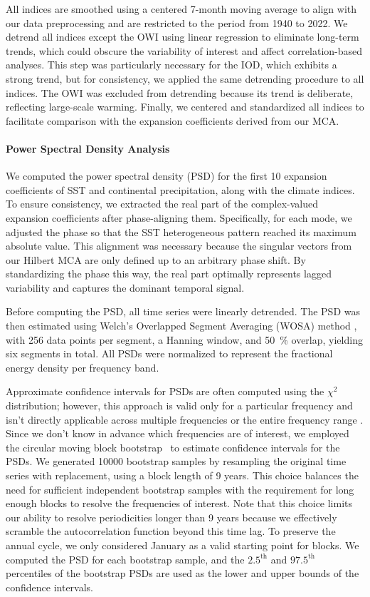 All indices are smoothed using a centered 7-month moving average to align with our data preprocessing and are restricted to the period from 1940 to 2022. We detrend all indices except the OWI using linear regression to eliminate long-term trends, which could obscure the variability of interest and affect correlation-based analyses. This step was particularly necessary for the IOD, which exhibits a strong trend, but for consistency, we applied the same detrending procedure to all indices. The OWI was excluded from detrending because its trend is deliberate, reflecting large-scale warming. Finally, we centered and standardized all indices to facilitate comparison with the expansion coefficients derived from our MCA.

\paragraph{Power Spectral Density Analysis}
We computed the power spectral density (PSD) for the first 10 expansion coefficients of SST and continental precipitation, along with the climate indices. To ensure consistency, we extracted the real part of the complex-valued expansion coefficients after phase-aligning them. Specifically, for each mode, we adjusted the phase so that the SST heterogeneous pattern reached its maximum absolute value. This alignment was necessary because the singular vectors from our Hilbert MCA are only defined up to an arbitrary phase shift. By standardizing the phase this way, the real part optimally represents lagged variability and captures the dominant temporal signal. 

Before computing the PSD, all time series were linearly detrended. The PSD was then estimated using Welch's Overlapped Segment Averaging (WOSA) method \cite[e.g.,][Section 8.8]{percival_spectral_2020}, with 256 data points per segment, a Hanning window, and \qty{50}{\percent} overlap, yielding six segments in total. All PSDs were normalized to represent the fractional energy density per frequency band.

Approximate confidence intervals for PSDs are often computed using the $\chi^2$ distribution; however, this approach is valid only for a particular frequency and isn't directly applicable across multiple frequencies or the entire frequency range \cite[cf.][p. 468]{priestley_spectral_1981}. Since we don't know in advance which frequencies are of interest, we employed the circular moving block bootstrap~\cite{politis_circular_1991} to estimate confidence intervals for the PSDs. We generated \num{10000} bootstrap samples by resampling the original time series with replacement, using a block length of 9 years. This choice balances the need for sufficient independent bootstrap samples with the requirement for long enough blocks to resolve the frequencies of interest. Note that this choice limits our ability to resolve periodicities longer than 9 years because we effectively scramble the autocorrelation function beyond this time lag. To preserve the annual cycle, we only considered January as a valid starting point for blocks. We computed the PSD for each bootstrap sample, and the $2.5^{\text{th}}$ and $97.5^{\text{th}}$ percentiles of the bootstrap PSDs are used as the lower and upper bounds of the confidence intervals.


